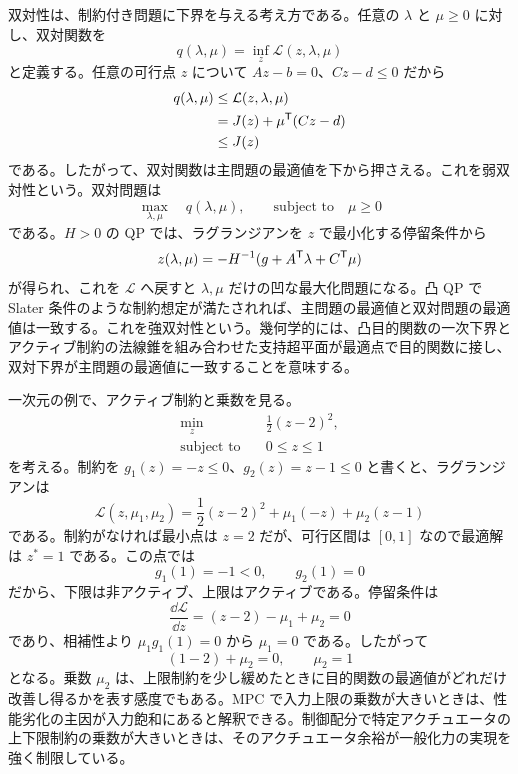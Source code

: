 双対性は、制約付き問題に下界を与える考え方である。任意の $\lambda$ と $\mu\ge0$ に対し、双対関数を
\begin{equation}
  q(\lambda,\mu)=\inf_z\mathcal{L}(z,\lambda,\mu)
\end{equation}
と定義する。任意の可行点 $z$ について $Az-b=0$、$Cz-d\le0$ だから
\begin{align}
  q(\lambda,\mu)
  &\le \mathcal{L}(z,\lambda,\mu)\\
  &=J(z)+\mu^{\mathsf{T}}(Cz-d)\\
  &\le J(z)
\end{align}
である。したがって、双対関数は主問題の最適値を下から押さえる。これを弱双対性という。双対問題は
\begin{equation}
  \max_{\lambda,\mu}\quad q(\lambda,\mu),
  \qquad
  \text{subject to}\quad \mu\ge0
\end{equation}
である。$H>0$ の QP では、ラグランジアンを $z$ で最小化する停留条件から
\begin{equation}
  z(\lambda,\mu)
  =-H^{-1}(g+A^{\mathsf{T}}\lambda+C^{\mathsf{T}}\mu)
\end{equation}
が得られ、これを $\mathcal{L}$ へ戻すと $\lambda,\mu$ だけの凹な最大化問題になる。凸 QP で Slater 条件のような制約想定が満たされれば、主問題の最適値と双対問題の最適値は一致する。これを強双対性という。幾何学的には、凸目的関数の一次下界とアクティブ制約の法線錐を組み合わせた支持超平面が最適点で目的関数に接し、双対下界が主問題の最適値に一致することを意味する。

一次元の例で、アクティブ制約と乗数を見る。
\begin{align}
  \min_z\quad &\frac{1}{2}(z-2)^2,\\
  \text{subject to}\quad &0\le z\le1
\end{align}
を考える。制約を $g_1(z)=-z\le0$、$g_2(z)=z-1\le0$ と書くと、ラグランジアンは
\begin{equation}
  \mathcal{L}(z,\mu_1,\mu_2)
  =\frac{1}{2}(z-2)^2+\mu_1(-z)+\mu_2(z-1)
\end{equation}
である。制約がなければ最小点は $z=2$ だが、可行区間は $[0,1]$ なので最適解は $z^*=1$ である。この点では
\begin{equation}
  g_1(1)=-1<0,
  \qquad
  g_2(1)=0
\end{equation}
だから、下限は非アクティブ、上限はアクティブである。停留条件は
\begin{equation}
  \frac{\dd\mathcal{L}}{\dd z}
  =(z-2)-\mu_1+\mu_2=0
\end{equation}
であり、相補性より $\mu_1g_1(1)=0$ から $\mu_1=0$ である。したがって
\begin{equation}
  (1-2)+\mu_2=0,
  \qquad
  \mu_2=1
\end{equation}
となる。乗数 $\mu_2$ は、上限制約を少し緩めたときに目的関数の最適値がどれだけ改善し得るかを表す感度でもある。MPC で入力上限の乗数が大きいときは、性能劣化の主因が入力飽和にあると解釈できる。制御配分で特定アクチュエータの上下限制約の乗数が大きいときは、そのアクチュエータ余裕が一般化力の実現を強く制限している。

